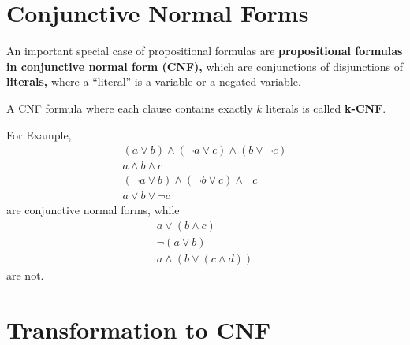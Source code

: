 \documentclass[12pt]{book}
\begin{document}
\section{Conjunctive Normal Forms}
\label{sec:Conjunctive Normal Forms}

\begin{defi}\label{def:CNF}
      An important special case of propositional formulas are \textbf{propositional formulas in conjunctive normal form (CNF),} which are
      conjunctions of disjunctions of \textbf{literals,}  where a ``literal'' is a variable or a negated variable.  
\end{defi}
\begin{defi}\label{def:CNF-2}
      A CNF formula where each clause contains exactly $k$ literals is called \textbf{k-CNF}.
\end{defi}
\begin{examp}\label{exp:cnf}
      For Example, \begin{eqnarray*}
      &(a\vee b) \wedge (\neg a \vee c) \wedge (b\vee \neg c)& \\
      &a\wedge b \wedge c& \\
      &(\neg a \vee b) \wedge (\neg b \vee c) \wedge \neg c& \\
      &a \vee b \vee \neg c&
\end{eqnarray*} 
are conjunctive normal forms, while
\begin{eqnarray*}
      &a\vee (b \wedge c)&\\
      &\neg(a\vee b)& \\
      &a \wedge (b\vee (c\wedge d))&
\end{eqnarray*}
are not. 
\end{examp}
\section{Transformation to CNF}
\label{sec:Transformation to CNF}
\end{document}
